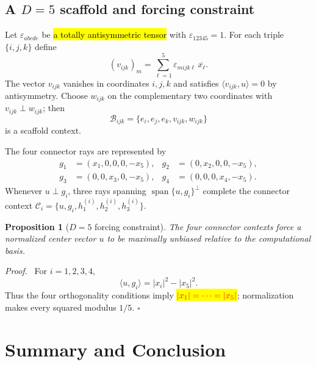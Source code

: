 \documentclass[%
  reprint,
  superscriptaddress,
  showpacs,
  showkeys,
  amsmath,amssymb,
  pra,
  longbibliography,
  floatfix,
  x11names
]{revtex4-2}
\newenvironment{revision}{\begingroup\color{revisionblue}}{\endgroup}
\newcommand{\corr}[1]{{\color{red}\hl{#1}}}
\newcommand{\corrmath}[1]{\begingroup\setlength{\fboxsep}{1pt}\colorbox{yellow}{\ensuremath{\color{red}#1}}\endgroup}
\newtheorem{proposition}{Proposition}
\newenvironment{proof}{\par\noindent\textit{Proof.}\ }{\hfill$\square$\par}
\begin{document}
\begin{revision}
\subsection{A $D=5$ scaffold and forcing constraint}

Let $\varepsilon_{abcde}$ be \corr{a totally antisymmetric tensor}
with $\varepsilon_{12345}=1$.  For each triple $\{i,j,k\}$ define
\[
(v_{ijk})_m=\sum_{\ell=1}^5\varepsilon_{mijk\ell}\,\overline{x_\ell}.
\]
The vector $v_{ijk}$ vanishes in coordinates $i,j,k$ and satisfies $\langle v_{ijk},u\rangle=0$ by antisymmetry.  Choose $w_{ijk}$ on the complementary two coordinates with $v_{ijk}\perp w_{ijk}$; then
\[
\mathcal{B}_{ijk}=\{e_i,e_j,e_k,v_{ijk},w_{ijk}\}
\]
is a scaffold context.

The four connector rays are represented by
\begin{align*}
g_1&=(x_1,0,0,0,-x_5),&
g_2&=(0,x_2,0,0,-x_5),\\
g_3&=(0,0,x_3,0,-x_5),&
g_4&=(0,0,0,x_4,-x_5).
\end{align*}
Whenever $u\perp g_i$, three rays spanning $\operatorname{span}\{u,g_i\}^{\perp}$ complete the connector context $\mathcal{C}_i=\{u,g_i,h^{(i)}_1,h^{(i)}_2,h^{(i)}_3\}$.

\begin{proposition}[$D=5$ forcing constraint]
\label{prop:D5forcing}
The four connector contexts force a normalized center vector $u$ to be maximally unbiased relative to the computational basis.
\end{proposition}

\begin{proof}
For $i=1,2,3,4$,
\[
\langle u,g_i\rangle=|x_i|^2-|x_5|^2.
\]
Thus the four orthogonality conditions imply \corrmath{|x_1|=\cdots=|x_5|};
normalization makes every squared modulus $1/5$.
\end{proof}
\end{revision}

\section{Summary and Conclusion}

\end{document}
